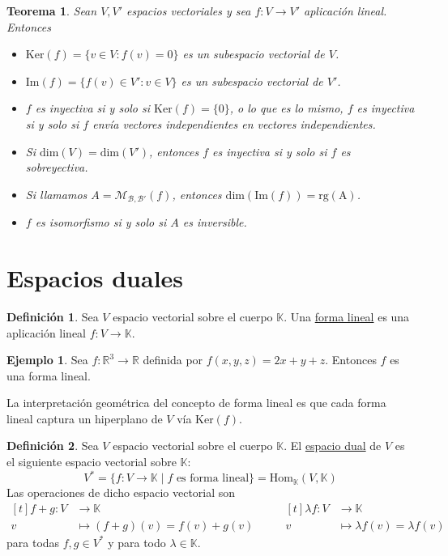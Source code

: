 \documentclass[12pt]{report}
\newtheorem{theorem}{Teorema}[chapter]
\theoremstyle{definition}
\newtheorem{definition}{Definición}[chapter]
\theoremstyle{definition}
\newtheorem{example}{Ejemplo}[chapter]
\theoremstyle{remark}
\newcommand{\R}{\mathbb R}
\begin{document}
\begin{theorem}
Sean $V,V'$ espacios vectoriales y sea $f \colon V \to V'$ aplicación lineal. Entonces
\begin{itemize}
    \item[(i)] $\mathrm{Ker} (f) = \{v \in V \colon f(v)=0\}$ es un subespacio vectorial de $V$.
    \item[(ii)] $\mathrm{Im} (f) = \{f(v) \in V' \colon v \in V\}$ es un subespacio vectorial de $V'$.
    \item[(iii)] $f$ es inyectiva si y solo si $\mathrm{Ker} (f) = \{0\}$, o lo que es lo mismo, $f$ es inyectiva si y solo si $f$ envía vectores independientes en vectores independientes.
    \item[(iv)] Si $\mathrm{dim}(V)=\mathrm{dim}(V')$, entonces $f$ es inyectiva si y solo si $f$ es sobreyectiva.
    \item[(v)] Si llamamos $A = \mathcal{M}_{\mathcal{B},\mathcal{B}'}(f)$, entonces $\mathrm{dim}(\mathrm{Im}(f)) = \mathrm{rg(A)}$.
    \item[(vi)] $f$ es isomorfismo si y solo si $A$ es inversible.
\end{itemize}
\end{theorem}

\section{Espacios duales}

\begin{definition}
Sea $V$ espacio vectorial sobre el cuerpo $\mathbb{K}$. Una \ul{forma lineal} es una aplicación lineal $f \colon V \to \mathbb{K}$.
\end{definition}

\begin{example}
Sea $f \colon \R^3 \to \R$ definida por $f(x,y,z) = 2x+y+z$. Entonces $f$ es una forma lineal.
\end{example}

La interpretación geométrica del concepto de forma lineal es que cada forma lineal captura un hiperplano de $V$ vía $\mathrm{Ker}(f)$.

\begin{definition}
Sea $V$ espacio vectorial sobre el cuerpo $\mathbb{K}$. El \ul{espacio dual} de $V$ es el siguiente espacio vectorial sobre $\mathbb{K}$:
\[V^* = \{f \colon V \to \mathbb{K} \mid f \textrm{ es forma lineal}\} = \mathrm{Hom}_{\mathbb{K}}(V,\mathbb{K})\]
Las operaciones de dicho espacio vectorial son 
\begin{equation*}
\begin{aligned}[t]
f+g \colon V &\longrightarrow \mathbb{K} \\
v &\longmapsto (f+g)(v) = f(v)+g(v)
\end{aligned}
\qquad
\begin{aligned}[t]
\lambda f \colon V &\longrightarrow \mathbb{K} \\
v &\longmapsto \lambda f(v) = \lambda f(v)
\end{aligned}
\end{equation*}
para todas $f,g \in V^*$ y para todo $\lambda \in \mathbb{K}$.
\end{definition}
\end{document}
